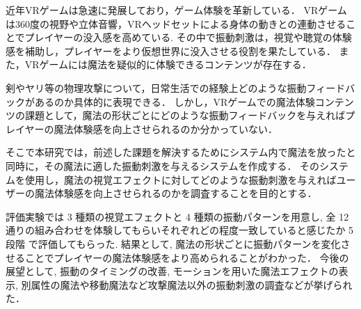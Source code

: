 近年VRゲームは急速に発展しており，ゲーム体験を革新している．
VRゲームは360度の視野や立体音響，VRヘッドセットによる身体の動きとの連動させることでプレイヤーの没入感を高めている.
その中で振動刺激は，視覚や聴覚の体験感を補助し，プレイヤーをより仮想世界に没入させる役割を果たしている．
また，VRゲームには魔法を疑似的に体験できるコンテンツが存在する．

剣やヤリ等の物理攻撃について，日常生活での経験上どのような振動フィードバックがあるのか具体的に表現できる．
しかし，VRゲームでの魔法体験コンテンツの課題として，魔法の形状ごとにどのような振動フィードバックを与えればプレイヤーの魔法体験感を向上させられるのか分かっていない．

そこで本研究では，前述した課題を解決するためにシステム内で魔法を放ったと同時に，その魔法に適した振動刺激を与えるシステムを作成する．
そのシステムを使用し，魔法の視覚エフェクトに対してどのような振動刺激を与えればユーザーの魔法体験感を向上させられるのかを調査することを目的とする．

評価実験では 3 種類の視覚エフェクトと 4 種類の振動パターンを用意し, 全 12 通りの組み合わせを体験してもらいそれぞれどの程度一致していると感じたか 5 段階
で評価してもらった. 
結果として, 魔法の形状ごとに振動パターンを変化させることでプレイヤーの魔法体験感をより高められることがわかった．
今後の展望として, 振動のタイミングの改善, モーションを用いた魔法エフェクトの表示, 別属性の魔法や移動魔法など攻撃魔法以外の振動刺激の調査などが挙げられた．
